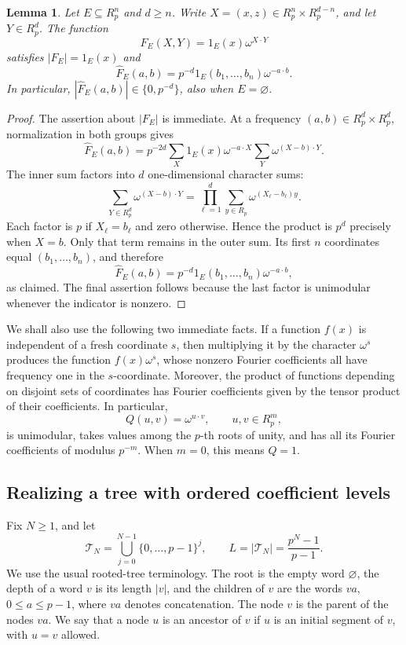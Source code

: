 \documentclass[11pt]{amsart}
\newtheorem{lemma}[theorem]{Lemma}
\theoremstyle{definition}
\theoremstyle{remark}
\newcommand{\R}{R}
\newcommand{\T}{\mathcal T}
\begin{document}
\begin{lemma}\label{lem:chirp}
Let \(E\subseteq\R_p^n\) and \(d\geq n\). Write
\(X=(x,z)\in\R_p^n\times\R_p^{d-n}\), and let \(Y\in\R_p^d\).
The function
\[
 F_E(X,Y)=1_E(x)\omega^{X\cdot Y}
\]
satisfies \(|F_E|=1_E(x)\) and
\begin{equation}
 \widehat F_E(a,b)=
 p^{-d}1_E(b_1,\ldots,b_n)\omega^{-a\cdot b}.
\end{equation}
In particular, \(|\widehat F_E(a,b)|\in\{0,p^{-d}\}\), also when
\(E=\varnothing\).
\end{lemma}

\begin{proof}
The assertion about \(|F_E|\) is immediate. At a frequency
\((a,b)\in\R_p^d\times\R_p^d\), normalization in both groups gives
\[
 \widehat F_E(a,b)
 =p^{-2d}\sum_X1_E(x)\omega^{-a\cdot X}
       \sum_Y\omega^{(X-b)\cdot Y}.
\]
The inner sum factors into \(d\) one-dimensional character sums:
\[
 \sum_{Y\in\R_p^d}\omega^{(X-b)\cdot Y}
 =\prod_{\ell=1}^d\sum_{y\in\R_p}
       \omega^{(X_\ell-b_\ell)y}.
\]
Each factor is \(p\) if \(X_\ell=b_\ell\) and zero otherwise. Hence
the product is \(p^d\) precisely when \(X=b\). Only that term remains
in the outer sum. Its first \(n\) coordinates equal
\((b_1,\ldots,b_n)\), and therefore
\[
 \widehat F_E(a,b)
 =p^{-d}1_E(b_1,\ldots,b_n)\omega^{-a\cdot b},
\]
as claimed. The final assertion follows because the last factor is
unimodular whenever the indicator is nonzero.
\end{proof}

We shall also use the following two immediate facts. If a function
\(f(x)\) is independent of a fresh coordinate \(s\), then multiplying
it by the character \(\omega^s\) produces the function
\(f(x)\omega^s\), whose nonzero Fourier coefficients all have
frequency one in the \(s\)-coordinate. Moreover, the product of
functions depending on disjoint sets of coordinates has Fourier
coefficients given by the tensor product of their coefficients.
In particular,
\[
 Q(u,v)=\omega^{u\cdot v},\qquad u,v\in\R_p^m,
\]
is unimodular, takes values among the \(p\)-th roots of unity, and has
all its Fourier coefficients of modulus \(p^{-m}\).
When \(m=0\), this means \(Q=1\).

\subsection{Realizing a tree with ordered coefficient levels}
Fix \(N\geq 1\), and let
\[
\T_N
=
\bigcup_{j=0}^{N-1}\{0,\ldots,p-1\}^j,
\qquad
L=|\T_N|
=
\frac{p^N-1}{p-1}.
\]
We use the usual rooted-tree terminology. The root is the empty word $\varnothing$, the depth of a word $v$ is its length $|v|$, and the children of $v$ are the words $va$, $0 \leq a \leq p-1$,  where \(va\) denotes concatenation. The node $v$ is the parent of the nodes $va$. We say that a node $u$ is an ancestor of $v$ if $u$ is an initial segment of $v$, with $u=v$ allowed.
\end{document}
